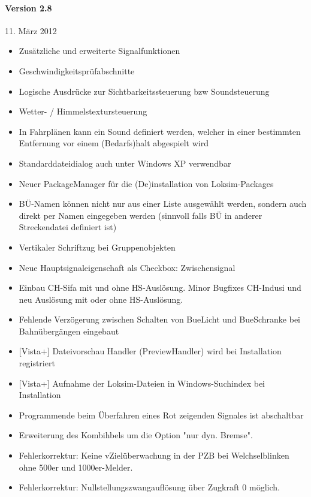 \paragraph{Version 2.8}

11. März 2012

\begin{itemize}
\itemsep1pt\parskip0pt
\item
  Zusätzliche und erweiterte Signalfunktionen
\item
  Geschwindigkeitsprüfabschnitte
\item
  Logische Ausdrücke zur Sichtbarkeitssteuerung bzw Soundsteuerung
\item
  Wetter- / Himmelstextursteuerung
\item
  In Fahrplänen kann ein Sound definiert werden, welcher in einer
  bestimmten Entfernung vor einem (Bedarfs)halt abgespielt wird
\item
  Standarddateidialog auch unter Windows XP verwendbar
\item
  Neuer PackageManager für die (De)installation von Loksim-Packages
\item
  BÜ-Namen können nicht nur aus einer Liste ausgewählt werden, sondern
  auch direkt per Namen eingegeben werden (sinnvoll falls BÜ in anderer
  Streckendatei definiert ist)
\item
  Vertikaler Schriftzug bei Gruppenobjekten
\item
  Neue Hauptsignaleigenschaft als Checkbox: Zwischensignal
\item
  Einbau CH-Sifa mit und ohne HS-Auslösung. Minor Bugfixes CH-Indusi und
  neu Auslösung mit oder ohne HS-Auslösung.
\item
  Fehlende Verzögerung zwischen Schalten von BueLicht und BueSchranke
  bei Bahnübergängen eingebaut
\item
  {[}Vista+{]} Dateivorschau Handler (PreviewHandler) wird bei
  Installation registriert
\item
  {[}Vista+{]} Aufnahme der Loksim-Dateien in Windows-Suchindex bei
  Installation
\item
  Programmende beim Überfahren eines Rot zeigenden Signales ist
  abschaltbar
\item
  Erweiterung des Kombihbels um die Option "nur dyn. Bremse".
\item
  Fehlerkorrektur: Keine vZielüberwachung in der PZB bei Welchselblinken
  ohne 500er und 1000er-Melder.
\item
  Fehlerkorrektur: Nullstellungszwangauflösung über Zugkraft 0 möglich.

\end{itemize}

